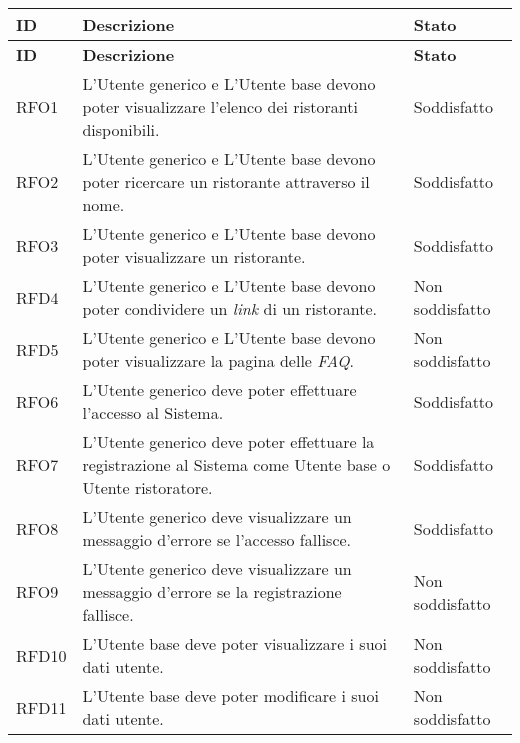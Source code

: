 \begin{longtable}{|l|p{}|p{3cm}|}
	\hline
	\textbf{ID} & \textbf{Descrizione}                                                                                                    & \textbf{Stato}  \\
	\endfirsthead
	\hline
	\textbf{ID} & \textbf{Descrizione}                                                                                                    & \textbf{Stato}  \\
	\hline
	\endhead
	\hline
	RFO1        & L'Utente generico e L'Utente base devono poter visualizzare l'elenco dei ristoranti disponibili.                        & Soddisfatto \\
	\hline
	RFO2        & L'Utente generico e L'Utente base devono poter ricercare un ristorante attraverso il nome.               				  & Soddisfatto \\
	\hline
	RFO3        & L'Utente generico e L'Utente base devono poter visualizzare un ristorante.                                              & Soddisfatto \\
	\hline
	RFD4        & L'Utente generico e L'Utente base devono poter condividere un \textit{link} di un ristorante.                           & Non soddisfatto \\
	\hline
	RFD5        & L'Utente generico e L'Utente base devono poter visualizzare la pagina delle  \textit{FAQ\g}.                            & Non soddisfatto \\
	\hline
	RFO6        & L'Utente generico deve poter effettuare l'accesso al Sistema.                                                           & Soddisfatto \\
	\hline
	RFO7        & L'Utente generico deve poter effettuare la registrazione al Sistema come Utente base o Utente ristoratore.              & Soddisfatto \\
	\hline
	RFO8        & L'Utente generico deve visualizzare un messaggio d'errore se l'accesso fallisce.                                        & Soddisfatto \\
	\hline
	RFO9        & L'Utente generico deve visualizzare un messaggio d'errore se la registrazione fallisce.                                 & Non soddisfatto \\
	\hline
	RFD10       & L'Utente base deve poter visualizzare i suoi dati utente.                                                               & Non soddisfatto \\
	\hline
	RFD11       & L'Utente base deve poter modificare i suoi dati utente.                                                                 & Non soddisfatto \\

\end{longtable}
